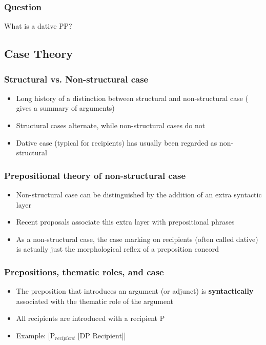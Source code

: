 \documentclass{beamer}
\begin{document}
\begin{frame}
	\frametitle{Question}
	\vfill
	\Large
		What is a dative PP?
	\vfill
\end{frame}
\subsection{Case Theory}
\begin{frame}
	\frametitle{Structural vs. Non-structural case}
	\begin{itemize}
		\item Long history of a distinction between structural and non-structural case (\citet{Woolford.2006} gives a summary of arguments)
		\item Structural cases alternate, while non-structural cases do not
		\item Dative case (typical for recipients) has usually been regarded as non-structural
	\end{itemize}
\end{frame}

\begin{frame}
	\frametitle{Prepositional theory of non-structural case}
	\begin{itemize}
		\item Non-structural case can be distinguished by the addition of an extra syntactic layer \citep{Bittner.1996,Bayer.2001}
		\item Recent proposals associate this extra layer with prepositional phrases \citep{Asbury.2005,Asbury.2007,Rezac.2008,Caha.2009}
		\item As a non-structural case, the case marking on recipients (often called dative) is actually just the morphological reflex of a preposition concord
	\end{itemize}
\end{frame}

\begin{frame}
	\frametitle{Prepositions, thematic roles, and case}
	\begin{itemize}
		\item The preposition that introduces an argument (or adjunct) is \textbf{syntactically} associated with the thematic role of the argument
		\item All recipients are introduced with a recipient P
		\item Example: [P$_{recipient}$ [DP Recipient]]
	\end{itemize}
\end{frame}
\end{document}
